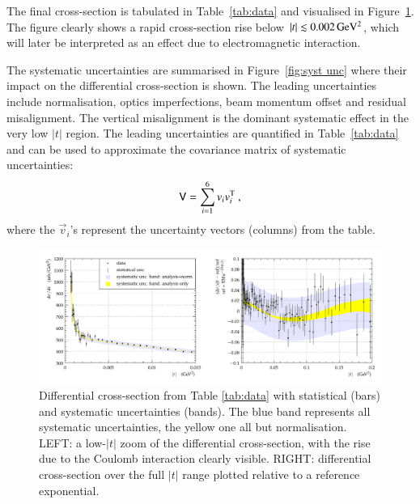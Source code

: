 The final cross-section is tabulated in Table~\ref{tab:data} and visualised in Figure~\ref{fig:dsdt}. The figure clearly shows a rapid cross-section rise below $|t| \lesssim 0.002\,{\rm GeV^2}$, which will later be interpreted as an effect due to electromagnetic interaction.

The systematic uncertainties are summarised in Figure~\ref{fig:syst unc} where their impact on the differential cross-section is shown. The leading uncertainties include normalisation, optics imperfections, beam momentum offset and residual misalignment. The vertical misalignment is the dominant systematic effect in the very low $|t|$ region. The leading uncertainties are quantified in Table~\ref{tab:data} and can be used to approximate the covariance matrix of systematic uncertainties:
\begin{equation}
\label{eq:covar mat}
\mathsf{V} = \sum_{i=1}^{6} v_i v_i^{\rm T}\ ,
\end{equation}
where the $\vec v_i$'s represent the uncertainty vectors (columns) from the table.







\begin{figure}
\vskip-5mm
\begin{center}
\includegraphics[width=18cm]{fig/t_dist_tabulation.pdf}
\vskip-3mm
\caption{%
Differential cross-section from Table \ref{tab:data} with statistical (bars) and systematic uncertainties (bands). The blue band represents all systematic uncertainties, the yellow one all but normalisation. LEFT: a low-$|t|$ zoom of the differential cross-section, with the rise due to the Coulomb interaction clearly visible. RIGHT: differential cross-section over the full $|t|$ range plotted relative to a reference exponential.
}
\label{fig:dsdt}
\end{center}
\end{figure}


